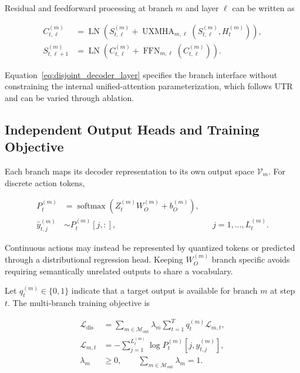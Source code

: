 Residual and feedforward processing at branch $m$ and layer $\ell$ can be written as

\begin{equation}
\begin{aligned}
    C_{t,\ell}^{(m)}
    &= \operatorname{LN}\!\left(
       S_{t,\ell}^{(m)}+
       \operatorname{UXMHA}_{m,\ell}\!\left(
       S_{t,\ell}^{(m)},H_t^{(m)}
       \right)
       \right),\\
    S_{t,\ell+1}^{(m)}
    &= \operatorname{LN}\!\left(
       C_{t,\ell}^{(m)}+
       \operatorname{FFN}_{m,\ell}\!\left(C_{t,\ell}^{(m)}\right)
       \right).
\end{aligned}
\label{eq:disjoint_decoder_layer}
\end{equation}

Equation~\eqref{eq:disjoint_decoder_layer} specifies the branch interface without constraining the internal unified-attention parameterization, which follows UTR and can be varied through ablation.

\subsection{\textbf{Independent Output Heads and Training Objective}}

Each branch maps its decoder representation to its own output space $\mathcal{V}_m$. For discrete action tokens,

\begin{equation}
\begin{aligned}
    P_t^{(m)}
    &= \operatorname{softmax}\!\left(
       Z_t^{(m)}W_{O}^{(m)}+b_{O}^{(m)}
       \right),\\
    \widehat{y}_{t,j}^{(m)}
    &\sim P_t^{(m)}[j,:],
    &&j=1,\ldots,L_t^{(m)}.
\end{aligned}
\label{eq:disjoint_output_head}
\end{equation}

Continuous actions may instead be represented by quantized tokens or predicted through a distributional regression head. Keeping $W_O^{(m)}$ branch specific avoids requiring semantically unrelated outputs to share a vocabulary.

Let $q_t^{(m)}\in\{0,1\}$ indicate that a target output is available for branch $m$ at step $t$. The multi-branch training objective is

\begin{equation}
\begin{aligned}
    \mathcal{L}_{\mathrm{dis}}
    &= \sum_{m\in\mathcal{M}_{\mathrm{out}}}
       \lambda_m
       \sum_{t=1}^{T}q_t^{(m)}
       \mathcal{L}_{m,t},\\
    \mathcal{L}_{m,t}
    &= -\sum_{j=1}^{L_t^{(m)}}
       \log P_t^{(m)}
       \!\left[j,y_{t,j}^{(m)}\right],\\
    \lambda_m&\geq0,
    \qquad
    \sum_{m\in\mathcal{M}_{\mathrm{out}}}\lambda_m=1.
\end{aligned}
\label{eq:disjoint_loss}
\end{equation}

